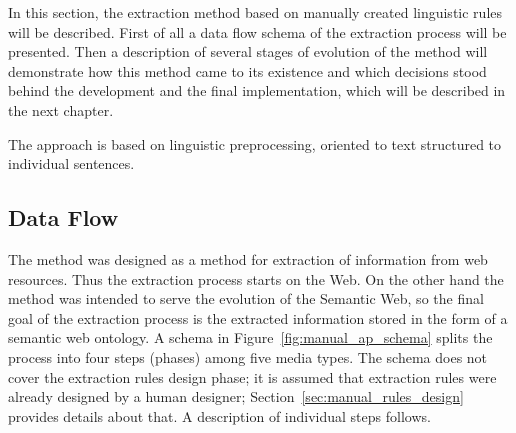 

In this section, the extraction method based on manually created linguistic rules will be described. First of all a data flow schema of the extraction process will be presented. Then a description of several stages of evolution of the method will demonstrate how this method came to its existence and which decisions stood behind the development and the final implementation, which will be described in the next chapter.

The approach is based on linguistic preprocessing, oriented to text structured to individual sentences. 



\subsection{Data Flow} \label{sec:manual_data_flow}




The method was designed as a method for extraction of information from web resources. Thus the extraction process starts on the Web. On the other hand the method was intended to serve the evolution of the Semantic Web, so the final goal of the extraction process is the extracted information stored in the form of a semantic web ontology. A schema in Figure~\ref{fig:manual_ap_schema} splits the process into four steps (phases) among five media types. The schema does not cover the extraction rules design phase; it is assumed that extraction rules were already designed by a human designer; Section~\ref{sec:manual_rules_design} provides details about that. A description of individual steps follows. 


